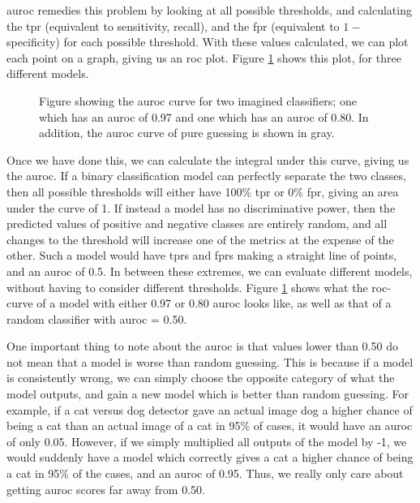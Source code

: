 \documentclass[UKenglish]{uiomasterthesis} %
\theoremstyle{definition}
\begin{document}
\ac{auroc} remedies this problem by looking at all possible thresholds, and calculating the \ac{tpr} (equivalent to sensitivity, recall), and the \ac{fpr} (equivalent to $1 -$ specificity) for each possible threshold. With these values calculated, we can plot each point on a graph, giving us an \ac{roc} plot. Figure \ref{fig:auroc} shows this plot, for three different models.

\begin{figure}[H]
    \begin{center}
        
    \end{center}
    \caption[AUROC example figure]{Figure showing the \ac{auroc} curve for two imagined classifiers; one which has an \ac{auroc} of 0.97 and one which has an \ac{auroc} of 0.80. In addition, the \ac{auroc} curve of pure guessing is shown in gray.}
    \label{fig:auroc}
\end{figure}

Once we have done this, we can calculate the integral under this curve, giving us the \ac{auroc}. If a binary classification model can perfectly separate the two classes, then all possible thresholds will either have 100\% \ac{tpr} or 0\% \ac{fpr}, giving an area under the curve of 1. If instead a model has no discriminative power, then the predicted values of positive and negative classes are entirely random, and all changes to the threshold will increase one of the metrics at the expense of the other. Such a model would have \acp{tpr} and \acp{fpr} making a straight line of points, and an \ac{auroc} of 0.5. In between these extremes, we can evaluate different models, without having to consider different thresholds. Figure \ref{fig:auroc} shows what the \ac{roc}-curve of a model with either 0.97 or 0.80 \ac{auroc} looks like, as well as that of a random classifier with \ac{auroc} = 0.50. 

One important thing to note about the \ac{auroc} is that values lower than 0.50 do not mean that a model is worse than random guessing. This is because if a model is consistently wrong, we can simply choose the opposite category of what the model outputs, and gain a new model which is better than random guessing. For example, if a cat versus dog detector gave an actual image dog a higher chance of being a cat than an actual image of a cat in 95\% of cases, it would have an \ac{auroc} of only 0.05. However, if we simply multiplied all outputs of the model by -1, we would suddenly have a model which correctly gives a cat a higher chance of being a cat in 95\% of the cases, and an \ac{auroc} of 0.95. Thus, we really only care about getting \ac{auroc} scores far away from 0.50.\\
\end{document}
